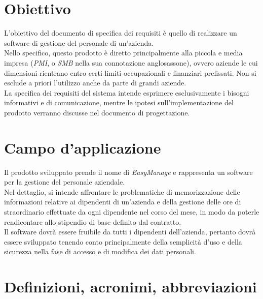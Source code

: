 \documentclass{scrreprt}
\begin{document}
\section{Obiettivo}
L'obiettivo del documento di specifica dei requisiti è quello di realizzare un software di gestione del personale di un'azienda.\\
Nello specifico, questo prodotto è diretto principalmente alla piccola e media impresa (\textit{PMI}, o \textit{SMB} nella sua connotazione anglosassone), ovvero aziende le cui dimensioni rientrano entro certi limiti occupazionali e finanziari prefissati. Non si esclude a priori l'utilizzo anche da parte di grandi aziende.\\
La specifica dei requisiti del sistema intende esprimere esclusivamente i bisogni informativi e di comunicazione, mentre le ipotesi sull'implementazione del prodotto verranno discusse nel documento di progettazione.


\section{Campo d'applicazione}
Il prodotto sviluppato prende il nome di \textit{EasyManage} e rappresenta un software per la gestione del personale aziendale.
\\
Nel dettaglio, si intende affrontare le problematiche di memorizzazione delle informazioni relative ai dipendenti di un'azienda e della gestione delle ore di straordinario effettuate da ogni dipendente nel corso del mese, in modo da poterle rendicontare allo stipendio di base definito dal contratto.
\\
Il software dovrà essere fruibile da tutti i dipendenti dell'azienda, pertanto dovrà essere sviluppato tenendo conto principalmente della semplicità d'uso e della sicurezza nella fase di accesso e di modifica dei dati personali.

\pagebreak


\section{Definizioni, acronimi, abbreviazioni}
\end{document}
